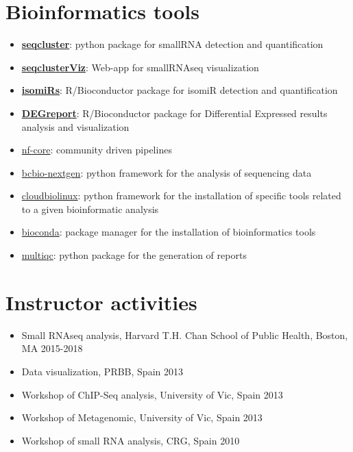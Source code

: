\hypertarget{tools}{
\section{Bioinformatics tools}\label{tools}}

\begin{itemize}
\tightlist
\item
  \href{http://github.com/lpantano/seqcluster}{\textbf{seqcluster}}:
  python package for smallRNA detection and quantification
\item
  \href{http://github.com/lpantano/seqclusterViz}{\textbf{seqclusterViz}}:
  Web-app for smallRNAseq visualization
\item
  \href{http://github.com/lpantano/isomiRs}{\textbf{isomiRs}}:
  R/Bioconductor package for isomiR detection and quantification
\item
  \href{http://github.com/lpantano/DEGreport}{\textbf{DEGreport}}:
  R/Bioconductor package for Differential Expressed results analysis
  and visualization
\item 
  \href{https://nf-co.re/}{nf-core}: community driven pipelines
\item
  \href{http://github.com/chapmanb/bcbio-nextgen}{bcbio-nextgen}:
  python framework for the analysis of sequencing data
\item
  \href{http://github.com/chapmanb/cloudbiolinux}{cloudbiolinux}:
  python framework for the installation of specific tools related to
  a given bioinformatic analysis
\item
  \href{https://github.com/bioconda/bioconda-recipes}{bioconda}:
  package manager for the installation of bioinformatics tools
\item
  \href{https://github.com/ewels/MultiQC}{multiqc}: python package
  for the generation of reports
\end{itemize}

\hypertarget{instructor-activities}{%
\section{Instructor activities}\label{instructor-activities}}

\begin{itemize}
\tightlist
\item
  Small RNAseq analysis, Harvard T.H. Chan School of Public Health, Boston, MA \hfill 2015-2018
\item
  Data visualization, PRBB, Spain \hfill 2013
\item
  Workshop of ChIP-Seq analysis, University of Vic, Spain \hfill 2013
\item
  Workshop of Metagenomic, University of Vic, Spain \hfill 2013
\item
  Workshop of small RNA analysis, CRG, Spain \hfill 2010
\end{itemize}

